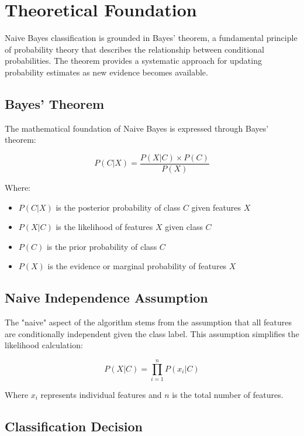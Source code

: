 \documentclass[11pt,a4paper]{article}
\begin{document}
\section{Theoretical Foundation}

Naive Bayes classification is grounded in Bayes' theorem, a fundamental principle of probability theory that describes the relationship between conditional probabilities. The theorem provides a systematic approach for updating probability estimates as new evidence becomes available.

\subsection{Bayes' Theorem}

The mathematical foundation of Naive Bayes is expressed through Bayes' theorem:

\begin{equation}
P(C|X) = \frac{P(X|C) \times P(C)}{P(X)}
\end{equation}

Where:
\begin{itemize}
    \item $P(C|X)$ is the posterior probability of class $C$ given features $X$
    \item $P(X|C)$ is the likelihood of features $X$ given class $C$
    \item $P(C)$ is the prior probability of class $C$
    \item $P(X)$ is the evidence or marginal probability of features $X$
\end{itemize}

\subsection{Naive Independence Assumption}

The "naive" aspect of the algorithm stems from the assumption that all features are conditionally independent given the class label. This assumption simplifies the likelihood calculation:

\begin{equation}
P(X|C) = \prod_{i=1}^{n} P(x_i|C)
\end{equation}

Where $x_i$ represents individual features and $n$ is the total number of features.

\subsection{Classification Decision}
\end{document}
